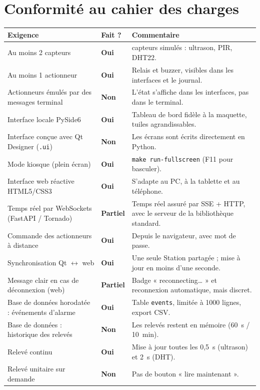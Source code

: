 \documentclass[11pt,a4paper]{article}
\newcommand{\ok}{\textcolor{ok}{\textbf{Oui}}}
\newcommand{\partiel}{\textcolor{partiel}{\textbf{Partiel}}}
\newcommand{\non}{\textcolor{non}{\textbf{Non}}}
\begin{document}
\section{Conformité au cahier des charges}\label{sec:conformite}
\begin{table}[H]
\centering\small
\renewcommand{\arraystretch}{1.2}
\begin{tabularx}{\linewidth}{>{\raggedright}p{5.2cm} l >{\raggedright\arraybackslash}X}
\toprule
\textbf{Exigence} & \textbf{Fait ?} & \textbf{Commentaire} \\
\midrule
Au moins 2 capteurs & \ok & 3 capteurs simulés : ultrason, PIR, DHT22. \\
Au moins 1 actionneur & \ok & Relais et buzzer, visibles dans les interfaces et le journal. \\
Actionneurs émulés par des messages terminal & \non & L'état s'affiche dans les interfaces, pas dans le terminal. \\
Interface locale PySide6 & \ok & Tableau de bord fidèle à la maquette, tuiles agrandissables. \\
Interface conçue avec Qt Designer (\texttt{.ui}) & \non & Les écrans sont écrits directement en Python. \\
Mode kiosque (plein écran) & \ok & \texttt{make run-fullscreen} (F11 pour basculer). \\
Interface web réactive HTML5/CSS3 & \ok & S'adapte au PC, à la tablette et au téléphone. \\
Temps réel par WebSockets (FastAPI / Tornado) & \partiel & Temps réel assuré par SSE + HTTP, avec le serveur de la bibliothèque standard. \\
Commande des actionneurs à distance & \ok & Depuis le navigateur, avec mot de passe. \\
Synchronisation Qt $\leftrightarrow$ web & \ok & Une seule Station partagée ; mise à jour en moins d'une seconde. \\
Message clair en cas de déconnexion (web) & \partiel & Badge « reconnecting… » et reconnexion automatique, mais discret. \\
Base de données horodatée : événements d'alarme & \ok & Table \texttt{events}, limitée à 1000 lignes, export CSV. \\
Base de données : historique des relevés & \non & Les relevés restent en mémoire (60~s / 10~min). \\
Relevé continu & \ok & Mise à jour toutes les 0,5~s (ultrason) et 2~s (DHT). \\
Relevé unitaire sur demande & \non & Pas de bouton « lire maintenant ». \\

\end{tabularx}
\end{table}
\end{document}
